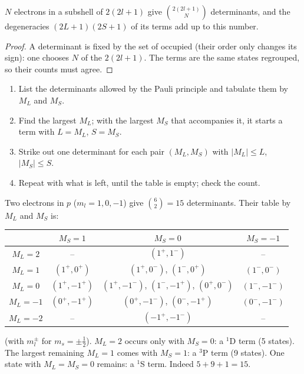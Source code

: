 \begin{proposition}\label{prop:b3:many-electron-atoms:count}
$N$ electrons in a subshell of $2(2l+1)$  give
$\binom{2(2l+1)}{N}$ determinants, and the degeneracies $(2L+1)(2S+1)$ of
its terms add up to this number.
\end{proposition}

\begin{proof}
A determinant is fixed by the set of occupied  (their order
only changes its sign): one chooses $N$ of the $2(2l+1)$. The terms are the
same states regrouped, so their counts must agree.
\end{proof}

\begin{method}\label{met:b3:many-electron-atoms:terms}
\begin{enumerate}
  \item List the determinants allowed by the Pauli principle and tabulate
        them by $M_L$ and $M_S$.
  \item Find the largest $M_L$; with the largest $M_S$ that accompanies it,
        it starts a term with $L = M_L$, $S = M_S$.
  \item Strike out one determinant for each pair $(M_L, M_S)$ with
        $|M_L| \le L$, $|M_S| \le S$.
  \item Repeat with what is left, until the table is empty; check the count.
\end{enumerate}
\end{method}

\begin{example}\label{ex:b3:many-electron-atoms:p2}
Two electrons in $p$ ($m_l = 1, 0, -1$) give $\binom62 = 15$ determinants.
Their table by $M_L$ and $M_S$ is:
\begin{center}\small
\begin{tabular}{c|ccc}
\hline
 & $M_S = 1$ & $M_S = 0$ & $M_S = -1$\\ \hline
$M_L = 2$ & -- & $(1^+,1^-)$ & --\\
$M_L = 1$ & $(1^+,0^+)$ & $(1^+,0^-)$, $(1^-,0^+)$ & $(1^-,0^-)$\\
$M_L = 0$ & $(1^+,-1^+)$ & $(1^+,-1^-)$, $(1^-,-1^+)$, $(0^+,0^-)$ & $(1^-,-1^-)$\\
$M_L = -1$ & $(0^+,-1^+)$ & $(0^+,-1^-)$, $(0^-,-1^+)$ & $(0^-,-1^-)$\\
$M_L = -2$ & -- & $(-1^+,-1^-)$ & --\\ \hline
\end{tabular}
\end{center}
(with $m_l^\pm$ for $m_s = \pm\frac12$). $M_L = 2$ occurs only with $M_S = 0$:
a ${}^1$D term (5 states). The largest remaining $M_L = 1$ comes with
$M_S = 1$: a ${}^3$P term (9 states). One state with $M_L = M_S = 0$ remains: a
${}^1$S term. Indeed $5 + 9 + 1 = 15$.
\end{example}

